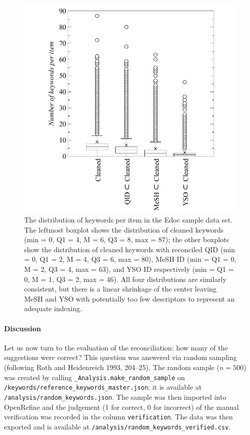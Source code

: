 \begin{figure}
\centering
\includegraphics{images/keywords_counted.pdf}
\caption{The distribution of keywords per item in the Edoc sample data
set. The leftmost boxplot shows the distribution of cleaned keywords
(min = 0, Q1 = 4, M = 6, Q3 = 8, max = 87); the other boxplots show the
distribution of cleaned keywords with reconciled QID (min = 0, Q1 = 2, M
= 4, Q3 = 6, max = 80), MeSH ID (min = Q1 = 0, M = 2, Q3 = 4, max = 63),
and YSO ID respectively (min = Q1 = 0, M = 1, Q3 = 2, max = 46). All
four distributions are similarly consistent, but there is a linear
shrinkage of the center leaving MeSH and YSO with potentially too few
descriptors to represent an adequate indexing.}
\end{figure}

\hypertarget{discussion}{%
\paragraph{Discussion}\label{discussion}}

Let us now turn to the evaluation of the reconciliation: how many of the
suggestions were correct? This question was answered via random sampling
(following Roth and Heidenreich 1993, 204--25). The random sample
(\(n=500\)) was created by calling
\texttt{\_Analysis.make\_random\_sample} on
\texttt{/keywords/reference\_keywords\_master.json}; it is available at
\texttt{/analysis/random\_keywords.json}. The sample was then imported
into OpenRefine and the judgement (1 for correct, 0 for incorrect) of
the manual verification was recorded in the column
\texttt{verification}. The data was then exported and is available at
\texttt{/analysis/random\_keywords\_verified.csv}.

